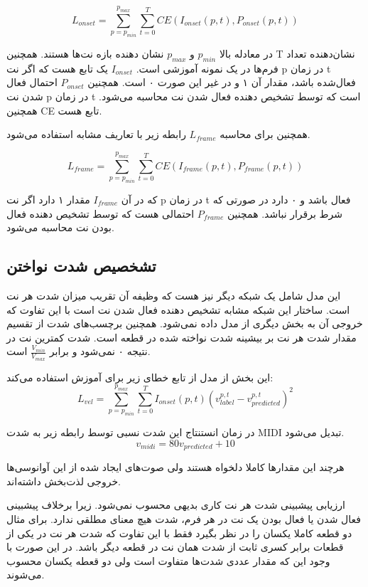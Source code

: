 \begin{equation}
    L_{onset} = \sum_{p=p_{min}}^{p_{max}}\sum_{t=0}^{T}
    CE(I_{onset}(p, t), P_{onset}(p, t))
\end{equation}

در معادله بالا
$p_{min}$
و
$p_{max}$
نشان دهنده بازه نت‌ها هستند. همچنین
T
نشان‌دهنده تعداد فرم‌ها در یک نمونه آموزشی است.
$I_{onset}$
یک تابع هست که اگر نت
p
در زمان
t
فعال‌شده باشد، مقدار آن ۱ و در غیر این صورت ۰ است. همچنین
$P_{onset}$
احتمال فعال شدن نت
p
در زمان
t
است که توسط تشخیص دهنده فعال شدن نت محاسبه می‌شود. همچنین
CE
تابع
هست.

همچنین برای محاسبه
$L_{frame}$
رابطه زیر با تعاریف مشابه استفاده می‌شود.

\begin{equation}
    L_{frame} = \sum_{p=p_{min}}^{p_{max}}\sum_{t=0}^{T}
    CE(I_{frame}(p, t), P_{frame}(p, t))
\end{equation}

که در آن
$I_{frame}$
مقدار ۱ دارد اگر نت
p
در زمان
t
فعال باشد و ۰ دارد در صورتی که شرط برقرار نباشد. همچنین
$P_{frame}$
احتمالی هست که توسط تشخیص دهنده فعال بودن نت محاسبه می‌شود.

\subsection{تشخصیص شدت نواختن}
این مدل شامل یک شبکه دیگر نیز هست که وظیفه آن تقریب میزان شدت هر نت است. ساختار
این شبکه مشابه تشخیص دهنده فعال شدن نت است با این تفاوت که خروجی آن به بخش دیگری
از مدل داده نمی‌شود. همچنین برچسب‌های شدت از تقسیم مقدار شدت هر نت بر بیشینه شدت
نواخته شده در قطعه است. شدت کمترین نت در نتیجه ۰ نمی‌شود و برابر
$\frac{V_{min}}{V_{max}}$
است.

این بخش از مدل از تابع خطای زیر برای آموزش استفاده می‌کند:
\begin{equation}
    L_{vel} = \sum_{p=p_{min}}^{p_{max}}\sum_{t=0}^{T}
    I_{onset}(p, t)(v_{label}^{p,t} - v_{predicted}^{p, t})^2
\end{equation}

در زمان انستنتاج این شدت نسبی توسط رابطه زیر به شدت
MIDI
تبدیل می‌شود.
\begin{equation}
    v_{midi} = 80v_{predicted} + 10
\end{equation}

هرچند این مقدارها کاملا دلخواه هستند ولی صوت‌های ایجاد شده از این آوانوسی‌ها خروجی
لذت‌بخش داشته‌اند.

ارزیابی پیشبینی شدت هر نت کاری بدیهی محسوب نمی‌شود. زیرا برخلاف پیشبینی فعال شدن
یا فعال بودن یک نت در هر فرم، شدت هیچ معنای مطلقی ندارد. برای مثال دو قطعه کاملا
یکسان را در نظر بگیرد فقط با این تفاوت که شدت هر نت در یکی از قطعات برابر کسری
ثابت از شدت همان نت در قطعه دیگر باشد. در این صورت با وجود این که مقدار عددی
شدت‌ها متفاوت است ولی دو قعطه یکسان محسوب می‌شوند.

